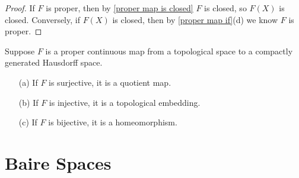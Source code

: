 \begin{proof}
If $F$ is proper, then by \cref{proper map is closed} $F$ is closed, so $F(X)$ is closed. Conversely, if $F(X)$ is closed, then by \cref{proper map if}(d) we know $F$ is proper.
\end{proof}
\begin{corollary}
Suppose $F$ is a proper continuous map from a topological space to a compactly generated Hausdorff space.
\begin{itemize}
\item[(a)] If $F$ is surjective, it is a quotient map.
\item[(b)] If $F$ is injective, it is a topological embedding.
\item[(c)] If $F$ is bijective, it is a homeomorphism.
\end{itemize}
\end{corollary}
\section{Baire Spaces}
